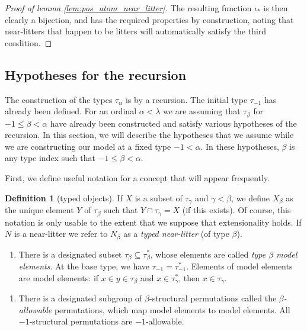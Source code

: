 \documentclass{article}
\theoremstyle{definition}
\newtheorem{definition}[theorem]{Definition}
\theoremstyle{remark}
\begin{document}
{\begin{proof}[Proof of lemma \ref{lem:pos_atom_near_litter}]
The resulting function $\iota_*$ is then clearly a bijection, and has the required properties by construction, noting that near-litters that happen to be litters will automatically satisfy the third condition.
\end{proof}

\subsection{Hypotheses for the recursion}\label{ss:hypotheses}

The construction of the types $\tau_\alpha$ is by a recursion.  The initial type $\tau_{-1}$ has already been defined.
For an ordinal $\alpha<\lambda$ we are assuming that $\tau_\beta$ for $-1\leq \beta<\alpha$ have already been constructed and satisfy various hypotheses of the recursion.
In this section, we will describe the hypotheses that we assume while we are constructing our model at a fixed type $-1 < \alpha$.
In these hypotheses, $\beta$ is any type index such that $-1 \leq \beta < \alpha$.

First, we define useful notation for a concept that will appear frequently.

\begin{definition}[typed objects]\label{def:typed_objects}
If $X$ is a subset of $\tau_\gamma$ and $\gamma<\beta$, we define $X_\beta$ as the unique element $Y$ of $\tau_\beta$
such that $Y \cap \tau_\gamma = X$ (if this exists).  Of course, this notation is only usable to the extent that we suppose that extensionality holds.
If $N$ is a near-litter we refer to $N_\beta$ as a {\em typed near-litter\/} (of type $\beta$).
\end{definition}


\newcommand{\nextih}[1]{%
\begin{enumerate}%
\setcounter{enumi}{\theihcounter}%
\addtocounter{ihcounter}{1}%
\renewcommand{\labelenumi}{(\textbf{I\theenumi})}%
\item#1%
\end{enumerate}}

\nextih{\label{ih:tau}There is a designated subset $\tau_\beta \subseteq \tau_\beta^*$, whose elements are called \emph{type $\beta$ model elements}.
At the base type, we have $\tau_{-1} = \tau_{-1}^*$.
Elements of model elements are model elements: if $x \in y \in \tau_\beta$ and $x \in \tau_\gamma^*$, then $x \in \tau_\gamma$.}

\nextih{\label{ih:allowable}There is a designated subgroup of $\beta$-structural permutations called the \emph{$\beta$-allowable} permutations, which map model elements to model elements. All $-1$-structural permutations are $-1$-allowable.}

}
\end{document}
